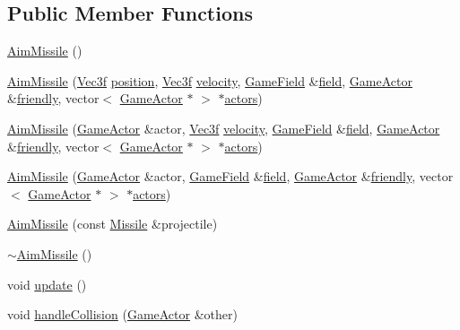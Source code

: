 \subsection*{Public Member Functions}
\begin{DoxyCompactItemize}
\item 
\hyperlink{class_aim_missile_ae3683254e6ee78ac44da195df3ab0346}{Aim\+Missile} ()
\item 
\hyperlink{class_aim_missile_af069670ad6122b80380b346d16bb4dfe}{Aim\+Missile} (\hyperlink{class_vec3f}{Vec3f} \hyperlink{class_game_actor_aefed3c91bf32ad388d86657b3bb9ddfa}{position}, \hyperlink{class_vec3f}{Vec3f} \hyperlink{class_game_actor_a95518bf01411eafe983df8815e8682d1}{velocity}, \hyperlink{class_game_field}{Game\+Field} \&\hyperlink{class_game_actor_a0224fbc502abd6b7579787aa234332d5}{field}, \hyperlink{class_game_actor}{Game\+Actor} \&\hyperlink{class_projectile_a54dec73f149e6619fac8f5cf8910edcc}{friendly}, vector$<$ \hyperlink{class_game_actor}{Game\+Actor} $\ast$ $>$ $\ast$\hyperlink{class_game_actor_a2405618d895f5143b42ae9e94d20e693}{actors})
\item 
\hyperlink{class_aim_missile_a6bc3a28a6d9ffb836c546c500767c11b}{Aim\+Missile} (\hyperlink{class_game_actor}{Game\+Actor} \&actor, \hyperlink{class_vec3f}{Vec3f} \hyperlink{class_game_actor_a95518bf01411eafe983df8815e8682d1}{velocity}, \hyperlink{class_game_field}{Game\+Field} \&\hyperlink{class_game_actor_a0224fbc502abd6b7579787aa234332d5}{field}, \hyperlink{class_game_actor}{Game\+Actor} \&\hyperlink{class_projectile_a54dec73f149e6619fac8f5cf8910edcc}{friendly}, vector$<$ \hyperlink{class_game_actor}{Game\+Actor} $\ast$ $>$ $\ast$\hyperlink{class_game_actor_a2405618d895f5143b42ae9e94d20e693}{actors})
\item 
\hyperlink{class_aim_missile_a07cedd9349560318323865759eb7c052}{Aim\+Missile} (\hyperlink{class_game_actor}{Game\+Actor} \&actor, \hyperlink{class_game_field}{Game\+Field} \&\hyperlink{class_game_actor_a0224fbc502abd6b7579787aa234332d5}{field}, \hyperlink{class_game_actor}{Game\+Actor} \&\hyperlink{class_projectile_a54dec73f149e6619fac8f5cf8910edcc}{friendly}, vector$<$ \hyperlink{class_game_actor}{Game\+Actor} $\ast$ $>$ $\ast$\hyperlink{class_game_actor_a2405618d895f5143b42ae9e94d20e693}{actors})
\item 
\hyperlink{class_aim_missile_a26202e854690528be958c6415c652b3d}{Aim\+Missile} (const \hyperlink{class_missile}{Missile} \&projectile)
\item 
\hyperlink{class_aim_missile_af79533845bd96620371edc6b97c4963f}{$\sim$\+Aim\+Missile} ()
\item 
void \hyperlink{class_aim_missile_a2723e6b87d30aa722b795e955a04ddfd}{update} ()
\item 
void \hyperlink{class_aim_missile_aedbbc65c9b383913d3a401bfba40cd4e}{handle\+Collision} (\hyperlink{class_game_actor}{Game\+Actor} \&other)
\end{DoxyCompactItemize}
